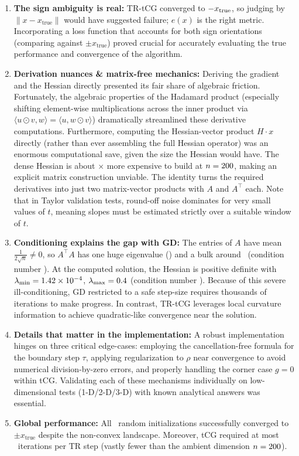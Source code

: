 \documentclass[10pt,a4paper]{article}
\newcommand{\inner}[2]{\langle #1,#2\rangle}
\newcommand{\xtrue}{x_{\mathrm{true}}}
\begin{document}
\begin{enumerate}

    \item \textbf{The sign ambiguity is real:} TR-tCG converged to $\TRSign\xtrue$, so judging by $\|x-\xtrue\|$ would have suggested failure; $e(x)$ is the right metric. Incorporating a loss function that accounts for both sign orientations (comparing against $\pm\xtrue$) proved crucial for accurately evaluating the true performance and convergence of the algorithm.

    \item \textbf{Derivation nuances \& matrix-free mechanics:} Deriving the gradient and the Hessian directly presented its fair share of algebraic friction. Fortunately, the algebraic properties of the Hadamard product (especially shifting element-wise multiplications across the inner product via $\inner{u\odot v}{w}=\inner{u}{w\odot v}$) dramatically streamlined these derivative computations. Furthermore, computing the Hessian-vector product $H \cdot x$ directly (rather than ever assembling the full Hessian operator) was an enormous computational save, given the size the Hessian would have. The dense Hessian is about \TimeHessRatio$\times$ more expensive to build at $n=200$, making an explicit matrix construction unviable. The identity turns the required derivatives into just two matrix-vector products with $A$ and $A^\top$ each. Note that in Taylor validation tests, round-off noise dominates for very small values of $t$, meaning slopes must be estimated strictly over a suitable window of $t$.

    \item \textbf{Conditioning explains the gap with GD:} The entries of $A$ have mean $\frac{1}{2\sqrt{n}}\neq 0$, so $A^\top A$ has one huge eigenvalue (\EigAtAMax) and a bulk around \EigAtAMedian\ (condition number \CondAtA). At the computed solution, the Hessian is positive definite with $\lambda_{\min}=1.42\times10^{-4}$, $\lambda_{\max}=0.4$ (condition number \CondHess). Because of this severe ill-conditioning, GD restricted to a safe step-size requires thousands of iterations to make progress. In contrast, TR-tCG leverages local curvature information to achieve quadratic-like convergence near the solution.

    \item \textbf{Details that matter in the implementation:} A robust implementation hinges on three critical edge-cases: employing the cancellation-free formula for the boundary step $\tau$, applying regularization to $\rho$ near convergence to avoid numerical division-by-zero errors, and properly handling the corner case $g=0$ within tCG. Validating each of these mechanisms individually on low-dimensional tests (1-D/2-D/3-D) with known analytical answers was essential.

    \item \textbf{Global performance:} All \ParamNStarts\ random initializations successfully converged to $\pm\xtrue$ despite the non-convex landscape. Moreover, tCG required at most \TRMaxTCG\ iterations per TR step (vastly fewer than the ambient dimension $n=200$).
\end{enumerate}
\end{document}
